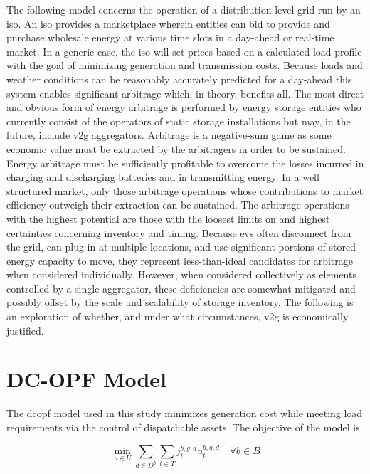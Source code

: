 \documentclass[12pt]{article}
\begin{document}
The following model concerns the operation of a distribution level grid run by an \gls{iso}. An \gls{iso} provides a marketplace wherein entities can bid to provide and purchase wholesale energy at various time slots in a day-ahead or real-time market. In a generic case, the \gls{iso} will set prices based on a calculated load profile with the goal of minimizing generation and transmission costs. Because loads and weather conditions can be reasonably accurately predicted for a day-ahead this system enables significant arbitrage which, in theory, benefits all. The most direct and obvious form of energy arbitrage is performed by energy storage entities who currently consist of the operators of static storage installations but may, in the future, include \gls{v2g} aggregators. Arbitrage is a negative-sum game as some economic value must be extracted by the arbitragers in order to be sustained. Energy arbitrage must be sufficiently profitable to overcome the losses incurred in charging and discharging batteries and in transmitting energy. In a well structured market, only those arbitrage operations whose contributions to market efficiency outweigh their extraction can be sustained. The arbitrage operations with the highest potential are those with the loosest limits on and highest certainties concerning inventory and timing. Because \glspl{ev} often disconnect from the grid, can plug in at multiple locations, and use significant portions of stored energy capacity to move, they represent less-than-ideal candidates for arbitrage when considered individually. However, when considered collectively as elements controlled by a single aggregator, these deficiencies are somewhat mitigated and possibly offset by the scale and scalability of storage inventory. The following is an exploration of whether, and under what circumstances, \gls{v2g} is economically justified.

\section*{DC-OPF Model}

The \gls{dcopf} model used in this study minimizes generation cost while meeting load requirements via the control of dispatchable assets. The objective of the model is

\begin{equation}
	\min_{u\in U}\sum_{d\in D^b}\sum_{t\in T} j^{b,g,d}_tu^{b,g,d}_t \quad\forall b\in B
\end{equation}
\end{document}
